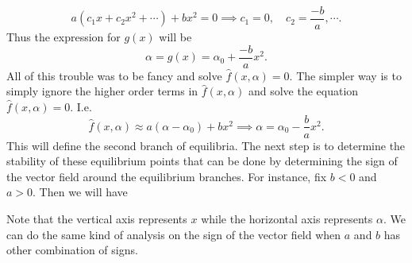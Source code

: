 \[ a(c_1x + c_2x^2 + \cdots) + bx^2 = 0 \implies c_1 = 0,\quad c_2 = \frac{-b}{a}, \cdots. \]
Thus the expression for $g(x)$ will be
\[ \alpha = g(x) = \alpha_0 + \frac{-b}{a}x^2 . \]
All of this trouble was to be fancy and solve $\hat{f}(x,\alpha)=0$. The simpler way is to simply ignore the higher order terms in $\hat{f}(x,\alpha)$ and solve the equation $\hat{f}(x,\alpha)=0$. I.e.
\[ \hat{f}(x,\alpha) \approx a(\alpha-\alpha_0) + bx^2 \implies \alpha = \alpha_0 -\frac{b}{a} x^2. \]
This will define the second branch of equilibria. The next step is to determine the stability of these equilibrium points that can be done by determining the sign of the vector field around the equilibrium branches. For instance, fix $b<0$ and $a>0$. Then we will have

\FloatBarrier
Note that the vertical axis represents $x$ while the horizontal axis represents $\alpha$. We can do the same kind of analysis on the sign of the vector field when $a$ and $b$ has other combination of signs.

